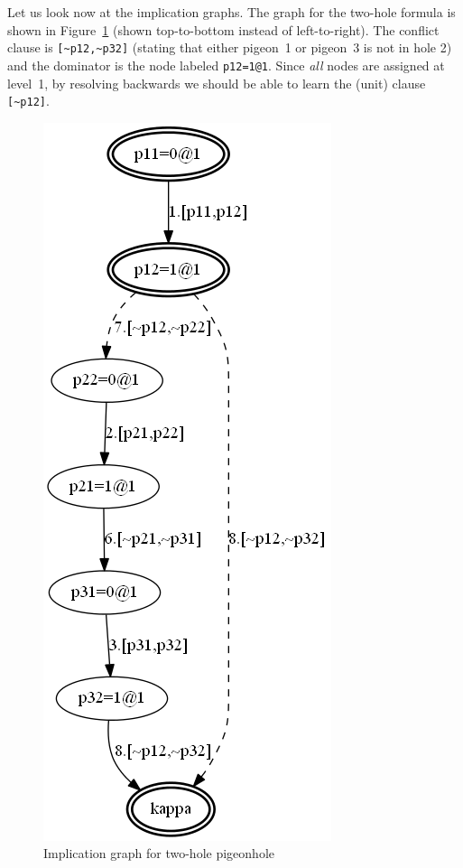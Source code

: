 \documentclass[11pt]{report}
\begin{document}
Let us look now at the implication graphs. The graph for the two-hole
formula is shown in Figure~\ref{pigeon2} (shown top-to-bottom instead of
left-to-right). The conflict clause is \verb+[~p12,~p32]+ (stating
that either pigeon~1 or pigeon~3 is not in hole 2) and the
dominator is the node labeled \verb+p12=1@1+. Since \emph{all} nodes
are assigned at level~1, by resolving backwards we should be able to
learn the (unit) clause \verb+[~p12]+.

\begin{figure}
\begin{center}
\includegraphics[keepaspectratio=true,height=.9\textheight]{pigeon2-bw}
\end{center}
\caption{Implication graph for two-hole pigeonhole}\label{pigeon2}
\end{figure}
\end{document}
